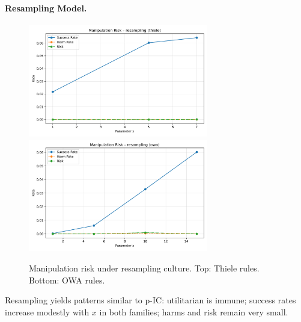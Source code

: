 \documentclass[11pt]{article}
\begin{document}
\paragraph{Resampling Model.}
\begin{figure}[h!]
\centering
\includegraphics[width=0.7\textwidth]{figures/risk_resampling_thiele.pdf}
\includegraphics[width=0.7\textwidth]{figures/risk_resampling_owa.pdf}
\caption{Manipulation risk under resampling culture. Top: Thiele rules. Bottom: OWA rules.}
\end{figure}
Resampling yields patterns similar to p-IC: utilitarian is immune; success rates increase
modestly with $x$ in both families; harms and risk remain very small.
\end{document}
